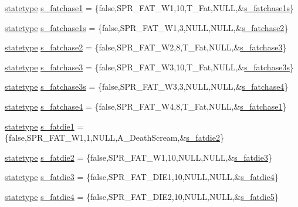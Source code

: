 \begin{DoxyCompactItemize}
\item 
\hyperlink{structstatestruct}{statetype} \hyperlink{WL__ACT2_8C_a7a5bc05a28fc2d5353459a65f27de274}{s\_\-fatchase1} = \{false,SPR\_\-FAT\_\-W1,10,T\_\-Fat,NULL,\&\hyperlink{WL__ACT2_8C_a5340eb27beeb3b953fdfb07c6edb204a}{s\_\-fatchase1s}\}
\item 
\hyperlink{structstatestruct}{statetype} \hyperlink{WL__ACT2_8C_a5340eb27beeb3b953fdfb07c6edb204a}{s\_\-fatchase1s} = \{false,SPR\_\-FAT\_\-W1,3,NULL,NULL,\&\hyperlink{WL__ACT2_8C_a4225091f6043a6880b6af10c9a80f857}{s\_\-fatchase2}\}
\item 
\hyperlink{structstatestruct}{statetype} \hyperlink{WL__ACT2_8C_a4225091f6043a6880b6af10c9a80f857}{s\_\-fatchase2} = \{false,SPR\_\-FAT\_\-W2,8,T\_\-Fat,NULL,\&\hyperlink{WL__ACT2_8C_ae098c545b121d2159fbf896e34c7a406}{s\_\-fatchase3}\}
\item 
\hyperlink{structstatestruct}{statetype} \hyperlink{WL__ACT2_8C_ae098c545b121d2159fbf896e34c7a406}{s\_\-fatchase3} = \{false,SPR\_\-FAT\_\-W3,10,T\_\-Fat,NULL,\&\hyperlink{WL__ACT2_8C_af9ee0d352f015413967f94307deb8273}{s\_\-fatchase3s}\}
\item 
\hyperlink{structstatestruct}{statetype} \hyperlink{WL__ACT2_8C_af9ee0d352f015413967f94307deb8273}{s\_\-fatchase3s} = \{false,SPR\_\-FAT\_\-W3,3,NULL,NULL,\&\hyperlink{WL__ACT2_8C_a4a40863cb1d0f011a66bd6bddf787ee0}{s\_\-fatchase4}\}
\item 
\hyperlink{structstatestruct}{statetype} \hyperlink{WL__ACT2_8C_a4a40863cb1d0f011a66bd6bddf787ee0}{s\_\-fatchase4} = \{false,SPR\_\-FAT\_\-W4,8,T\_\-Fat,NULL,\&\hyperlink{WL__DEF_8H_a7a5bc05a28fc2d5353459a65f27de274}{s\_\-fatchase1}\}
\item 
\hyperlink{structstatestruct}{statetype} \hyperlink{WL__ACT2_8C_a737bb7a90f84a719bdf398a39968ffed}{s\_\-fatdie1} = \{false,SPR\_\-FAT\_\-W1,1,NULL,A\_\-DeathScream,\&\hyperlink{WL__ACT2_8C_a3607e917f6f5fae70a66ec35fe5be9d6}{s\_\-fatdie2}\}
\item 
\hyperlink{structstatestruct}{statetype} \hyperlink{WL__ACT2_8C_a3607e917f6f5fae70a66ec35fe5be9d6}{s\_\-fatdie2} = \{false,SPR\_\-FAT\_\-W1,10,NULL,NULL,\&\hyperlink{WL__ACT2_8C_a8b76b73a19a81e94ab63d2cfcc7291a8}{s\_\-fatdie3}\}
\item 
\hyperlink{structstatestruct}{statetype} \hyperlink{WL__ACT2_8C_a8b76b73a19a81e94ab63d2cfcc7291a8}{s\_\-fatdie3} = \{false,SPR\_\-FAT\_\-DIE1,10,NULL,NULL,\&\hyperlink{WL__ACT2_8C_a6502b1d08c4be84b39ba6b3dbd18fa9f}{s\_\-fatdie4}\}
\item 
\hyperlink{structstatestruct}{statetype} \hyperlink{WL__ACT2_8C_a6502b1d08c4be84b39ba6b3dbd18fa9f}{s\_\-fatdie4} = \{false,SPR\_\-FAT\_\-DIE2,10,NULL,NULL,\&\hyperlink{WL__ACT2_8C_a2c89a533900581cc30bfb519c4ec5a96}{s\_\-fatdie5}\}

\end{DoxyCompactItemize}

